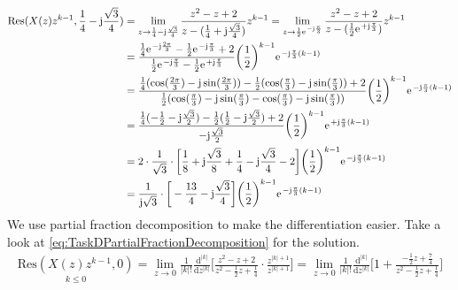 \begin{align}
	\mathrm{Res}(X(z)z^{k-1},\frac{1}{4}-\im\frac{\sqrt{3}}{4})&=\lim\limits_{z\rightarrow\frac{1}{4}-\im\frac{\sqrt{3}}{4}}\frac{z^2-z+2}{z-(\frac{1}{4}+\im\frac{\sqrt{3}}{4})}z^{k-1}=\lim\limits_{z\rightarrow\frac{1}{2}\e^{-\im\frac{\pi}{3}}}\frac{z^2-z+2}{z-(\frac{1}{2}\e^{+\im\frac{\pi}{3}})}z^{k-1}\nonumber\\
	&=\frac{\frac{1}{4}\e^{-\im\frac{2\pi}{3}}-\frac{1}{2}\e^{-\im\frac{\pi}{3}}+2}{\frac{1}{2}\e^{-\im\frac{\pi}{3}}-\frac{1}{2}\e^{+\im\frac{\pi}{3}}}\bigg(\frac{1}{2}\bigg )^{k-1}\e^{-\im\frac{\pi}{3}(k-1)}\nonumber\\
	&=\frac{\frac{1}{4}(\cos(\frac{2\pi}{3})-\im\sin(\frac{2\pi}{3}))-\frac{1}{2}(\cos(\frac{\pi}{3})-\im\sin(\frac{\pi}{3}))+2}{\frac{1}{2}(\cos(\frac{\pi}{3})-\im\sin(\frac{\pi}{3})-\cos(\frac{\pi}{3})-\im\sin(\frac{\pi}{3}))}\bigg(\frac{1}{2}\bigg )^{k-1}\e^{-\im\frac{\pi}{3}(k-1)}\nonumber\\
	&=\frac{\frac{1}{4}(-\frac{1}{2}-\im\frac{\sqrt{3}}{2})-\frac{1}{2}(\frac{1}{2}-\im\frac{\sqrt{3}}{2})+2}{-\im\frac{\sqrt{3}}{2}}\bigg(\frac{1}{2}\bigg )^{k-1}\e^{+\im\frac{\pi}{3}(k-1)}\nonumber\\
	&=2\cdot\frac{1}{\sqrt{3}}\cdot\bigg [\frac{1}{8}+\im\frac{\sqrt{3}}{8}+\frac{1}{4}-\im\frac{\sqrt{3}}{4}-2\bigg]\bigg(\frac{1}{2}\bigg )^{k-1}\e^{-\im\frac{\pi}{3}(k-1)}\nonumber\\
	&=\frac{1}{\im\sqrt{3}}\cdot\bigg [-\frac{13}{4}-\im\frac{\sqrt{3}}{4}\bigg]\bigg(\frac{1}{2}\bigg)^{k-1}\e^{-\im\frac{\pi}{3}(k-1)}
\end{align}
We use partial fraction decomposition to make the differentiation easier. Take a look at \ref{eq:TaskDPartialFractionDecomposition} for the solution.
\begin{align}
	\underset{k\leq0}{\mathrm{Res}(X(z)z^{k-1},0)}=\lim\limits_{z\rightarrow0}\frac{1}{|k|!}\frac{\mathrm{d}^{|k|}}{\mathrm{d}z^{|k|}} \Bigg [ \frac{z^2-z+2}{z^2-\frac{1}{2}z+\frac{1}{4}}\cdot\frac{z^{|k|+1}}{z^{|k|+1}}\Bigg ]=\lim\limits_{z\rightarrow0}\frac{1}{|k|!}\frac{\mathrm{d}^{|k|}}{\mathrm{d}z^{|k|}}\Bigg [1+\frac{-\frac{1}{2}z+\frac{7}{4}}{z^2-\frac{1}{2}z+\frac{1}{4}} \Bigg]\nonumber\\
\end{align}
